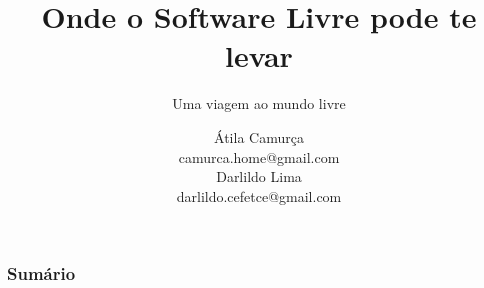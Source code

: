 \documentclass[10pt,mathserif]{beamer}
\title{Onde o Software Livre pode te levar}
\subtitle{Uma viagem ao mundo livre}
\author{Átila Camurça\\camurca.home@gmail.com\\Darlildo Lima\\darlildo.cefetce@gmail.com}
\begin{document}
\begin{frame}
\titlepage
\end{frame}

\begin{frame}\frametitle{Sumário}
\tableofcontents
\end{frame}


\end{document}
